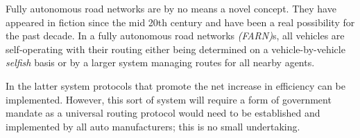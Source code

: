 Fully autonomous road networks are by no means a novel concept. They have appeared in fiction since the mid 20th century and have been a real possibility for the past decade. In a fully autonomous road networks \textit{(FARN)}s, all vehicles are self-operating with their routing either being determined on a vehicle-by-vehicle \textit{selfish} basis or by a larger system managing routes for all nearby agents. 

In the latter system protocols that promote the net increase in efficiency can be implemented. However, this sort of system will require a form of government mandate as a universal routing protocol would need to be established and implemented by all auto manufacturers; this is no small undertaking.


